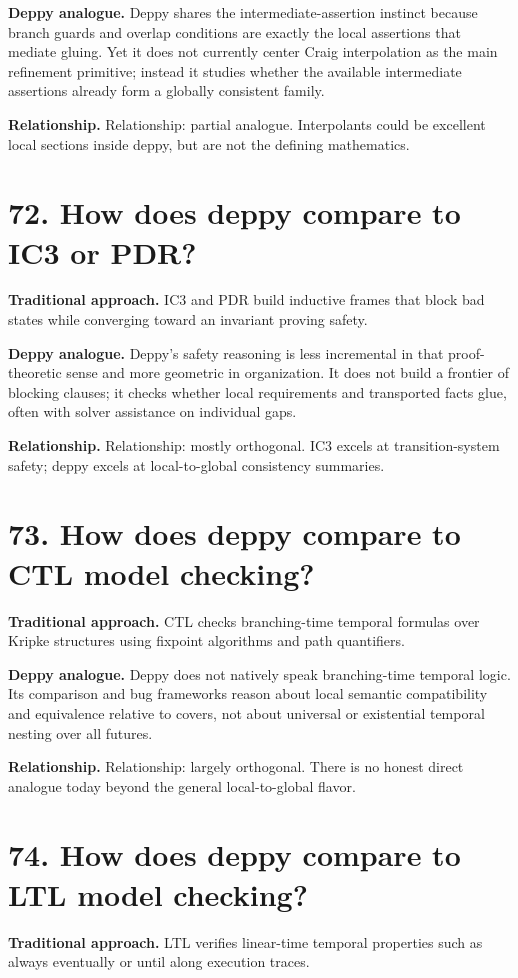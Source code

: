 \documentclass[11pt,openany]{book}
\begin{document}
\textbf{Deppy analogue.} Deppy shares the intermediate-assertion instinct because branch guards and overlap conditions are exactly the local assertions that mediate gluing. Yet it does not currently center Craig interpolation as the main refinement primitive; instead it studies whether the available intermediate assertions already form a globally consistent family.

\textbf{Relationship.} Relationship: partial analogue. Interpolants could be excellent local sections inside deppy, but are not the defining mathematics.

\section*{72. How does deppy compare to IC3 or PDR?}
\textbf{Traditional approach.} IC3 and PDR build inductive frames that block bad states while converging toward an invariant proving safety.

\textbf{Deppy analogue.} Deppy's safety reasoning is less incremental in that proof-theoretic sense and more geometric in organization. It does not build a frontier of blocking clauses; it checks whether local requirements and transported facts glue, often with solver assistance on individual gaps.

\textbf{Relationship.} Relationship: mostly orthogonal. IC3 excels at transition-system safety; deppy excels at local-to-global consistency summaries.

\section*{73. How does deppy compare to CTL model checking?}
\textbf{Traditional approach.} CTL checks branching-time temporal formulas over Kripke structures using fixpoint algorithms and path quantifiers.

\textbf{Deppy analogue.} Deppy does not natively speak branching-time temporal logic. Its comparison and bug frameworks reason about local semantic compatibility and equivalence relative to covers, not about universal or existential temporal nesting over all futures.

\textbf{Relationship.} Relationship: largely orthogonal. There is no honest direct analogue today beyond the general local-to-global flavor.

\section*{74. How does deppy compare to LTL model checking?}
\textbf{Traditional approach.} LTL verifies linear-time temporal properties such as always eventually or until along execution traces.
\end{document}
